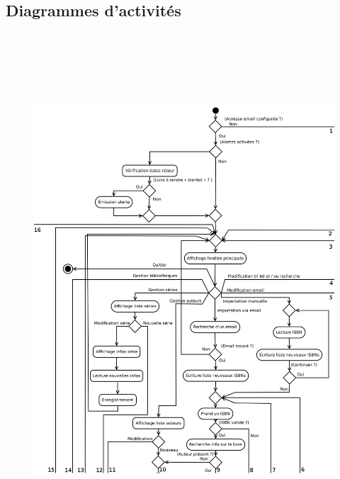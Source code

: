 \subsection{Diagrammes d'activités}

\begin{figure}[h!]
\begin{center}
\includegraphics[width=16cm, height=19cm]{uml/appli_pc/p1.png}
\end{center}
\end{figure}
\newpage{}

